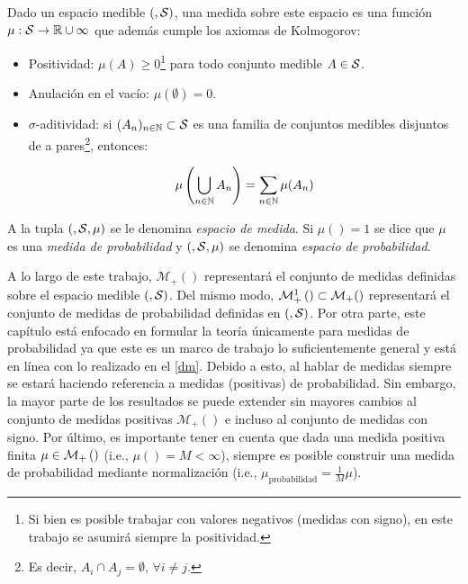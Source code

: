 \begin{defn}[medida]
    \label{defn:measure}

    Dado un espacio medible $(,\mathcal{S})$, una medida sobre este espacio es una función $\mu:\mathcal{S}\to\mathbb{R}\cup{\infty}$ que además cumple los axiomas de Kolmogorov:

    \begin{itemize}
        \item Positividad: $\mu(A)\geq 0$\footnote{Si bien es posible trabajar con valores negativos (medidas con signo), en este trabajo se asumirá siempre la positividad.} para todo conjunto medible $A\in\mathcal{S}$.
        \item Anulación en el vacío: $\mu(\emptyset) = 0$.
        \item $\sigma$-aditividad: si $(A_n)_{n\in\mathbb{N}}\subset\mathcal{S}$ es una familia de conjuntos medibles disjuntos de a pares\footnote{Es decir, $A_i\cap A_j = \emptyset,\,\forall i\neq j$.}, entonces:

              \begin{equation*}
                  \mu\left(\bigcup_{n\in\mathbb{N}} A_n\right) = \sum_{n\in\mathbb{N}} \mu(A_n)
              \end{equation*}

    \end{itemize}

    A la tupla $(,\mathcal{S},\mu)$ se le denomina \textit{espacio de medida}. Si $\mu(\xspace)=1$ se dice que $\mu$ es una \textit{medida de probabilidad} y $(,\mathcal{S},\mu)$ se denomina \textit{espacio de probabilidad}.
\end{defn}

A lo largo de este trabajo, $\mathcal{M}_+(\xspace)$ representará el conjunto de medidas definidas sobre el espacio medible $(,\mathcal{S})$. Del mismo modo, $\mathcal{M}_+^1\left(\right)\subset\mathcal{M}_+()$ representará el conjunto de medidas de probabilidad definidas en $(,\mathcal{S})$. Por otra parte, este capítulo está enfocado en formular la teoría únicamente para medidas de probabilidad ya que este es un marco de trabajo lo suficientemente general y está en línea con lo realizado en el \autoref{dm}. Debido a esto, al hablar de medidas siempre se estará haciendo referencia a medidas (positivas) de probabilidad. Sin embargo, la mayor parte de los resultados se puede extender sin mayores cambios al conjunto de medidas positivas $\mathcal{M}_+(\xspace)$ e incluso al conjunto de medidas con signo. Por último, es importante tener en cuenta que dada una medida positiva finita $\mu\in\mathcal{M}_+\left(\right)$ (i.e., $\mu(\xspace)=M<\infty$), siempre es posible construir una medida de probabilidad mediante normalización (i.e., $\mu_{\operatorname{probabilidad}} = \frac{1}{M}\mu$).

